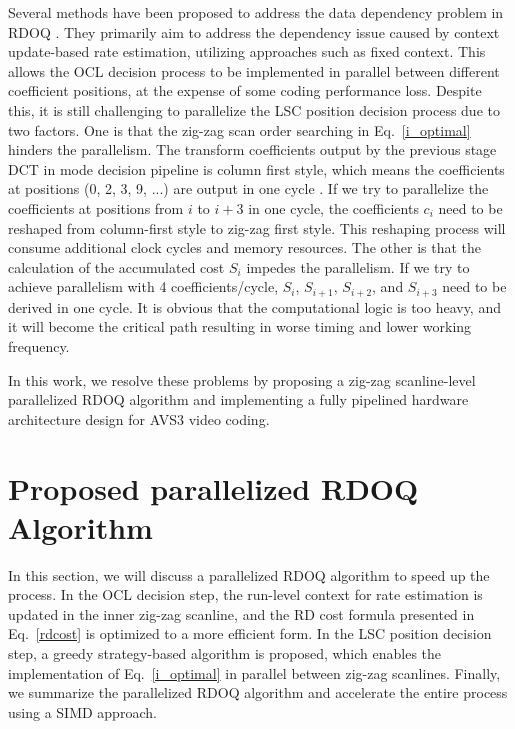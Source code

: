 \documentclass[lettersize,journal]{IEEEtran}
\begin{document}
Several methods have been proposed to address the data dependency problem in RDOQ \cite{igarashi2018parallelGPU,xu2022hardwarefriendlyforrdoq,zhao2023scanline}. They primarily aim to address the dependency issue caused by context update-based rate estimation, utilizing approaches such as fixed context. This allows the OCL decision process to be implemented in parallel between different coefficient positions, at the expense of some coding performance loss. Despite this, it is still challenging to parallelize the LSC position decision process due to two factors. One is that the zig-zag scan order searching in Eq.~\eqref{i_optimal} hinders the parallelism. The transform coefficients output by the previous stage DCT in mode decision pipeline is column first style, which means the coefficients at positions (0, 2, 3, 9, ...) are output in one cycle \cite{fan2019pipelined}. If we try to parallelize the coefficients at positions from $i$ to $i+3$ in one cycle, the coefficients $c_i$ need to be reshaped from column-first style to zig-zag first style. This reshaping process will consume additional clock cycles and memory resources. The other is that the calculation of the accumulated cost $S_{i}$ impedes the parallelism. If we try to achieve parallelism with 4 coefficients/cycle, $S_{i}$, $S_{i+1}$, $S_{i+2}$, and $S_{i+3}$ need to be derived in one cycle. It is obvious that the computational logic is too heavy, and it will become the critical path resulting in worse timing and lower working frequency. 

In this work, we resolve these problems by proposing a zig-zag scanline-level parallelized RDOQ algorithm and implementing a fully pipelined hardware architecture design for AVS3 video coding. 

\section{Proposed parallelized RDOQ Algorithm}
\label{sec:3}
In this section, we will discuss a parallelized RDOQ algorithm to speed up the process. In the OCL decision step, the run-level context for rate estimation is updated in the inner zig-zag scanline, and the RD cost formula presented in Eq.~\eqref{rdcost} is optimized to a more efficient form. In the LSC position decision step, a greedy strategy-based algorithm is proposed, which enables the implementation of Eq.~\eqref{i_optimal} in parallel between zig-zag scanlines. Finally, we summarize the parallelized RDOQ algorithm and accelerate the entire process using a SIMD approach. 
\end{document}
